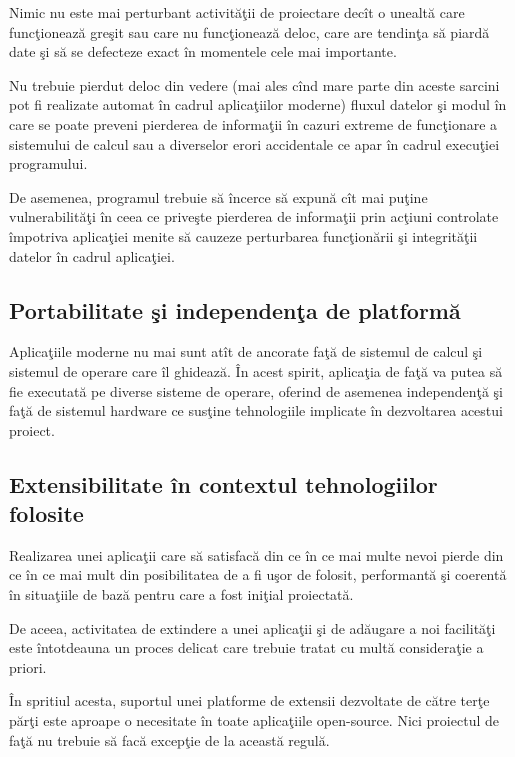 Nimic nu este mai perturbant activităţii de proiectare decît o unealtă care
funcţionează greşit sau care nu funcţionează deloc, care are tendinţa să piardă
date şi să se defecteze exact în momentele cele mai importante.

Nu trebuie pierdut deloc din vedere (mai ales cînd mare parte din aceste sarcini
pot fi realizate automat în cadrul aplicaţiilor moderne) fluxul datelor şi modul
în care se poate preveni pierderea de informaţii în cazuri extreme de
funcţionare a sistemului de calcul sau a diverselor erori accidentale ce apar în
cadrul execuţiei programului.

De asemenea, programul trebuie să încerce să expună cît mai puţine
vulnerabilităţi în ceea ce priveşte pierderea de informaţii prin acţiuni
controlate împotriva aplicaţiei menite să cauzeze perturbarea funcţionării şi
integrităţii datelor în cadrul aplicaţiei.

\subsection{Portabilitate şi independenţa de platformă}

Aplicaţiile moderne nu mai sunt atît de ancorate faţă de sistemul de calcul şi
sistemul de operare care îl ghidează. În acest spirit, aplicaţia de faţă va
putea să fie executată pe diverse sisteme de operare, oferind de asemenea
independenţă şi faţă de sistemul hardware ce susţine tehnologiile implicate în
dezvoltarea acestui proiect.

\subsection{Extensibilitate în contextul tehnologiilor folosite}

Realizarea unei aplicaţii care să satisfacă din ce în ce mai multe nevoi pierde
din ce în ce mai mult din posibilitatea de a fi uşor de folosit, performantă şi
coerentă în situaţiile de bază pentru care a fost iniţial proiectată.

De aceea, activitatea de extindere a unei aplicaţii şi de adăugare a noi
facilităţi este întotdeauna un proces delicat care trebuie tratat cu multă
consideraţie a priori.

În spritiul acesta, suportul unei platforme de extensii dezvoltate de către
terţe părţi este aproape o necesitate în toate aplicaţiile open-source. Nici
proiectul de faţă nu trebuie să facă excepţie de la această regulă.
